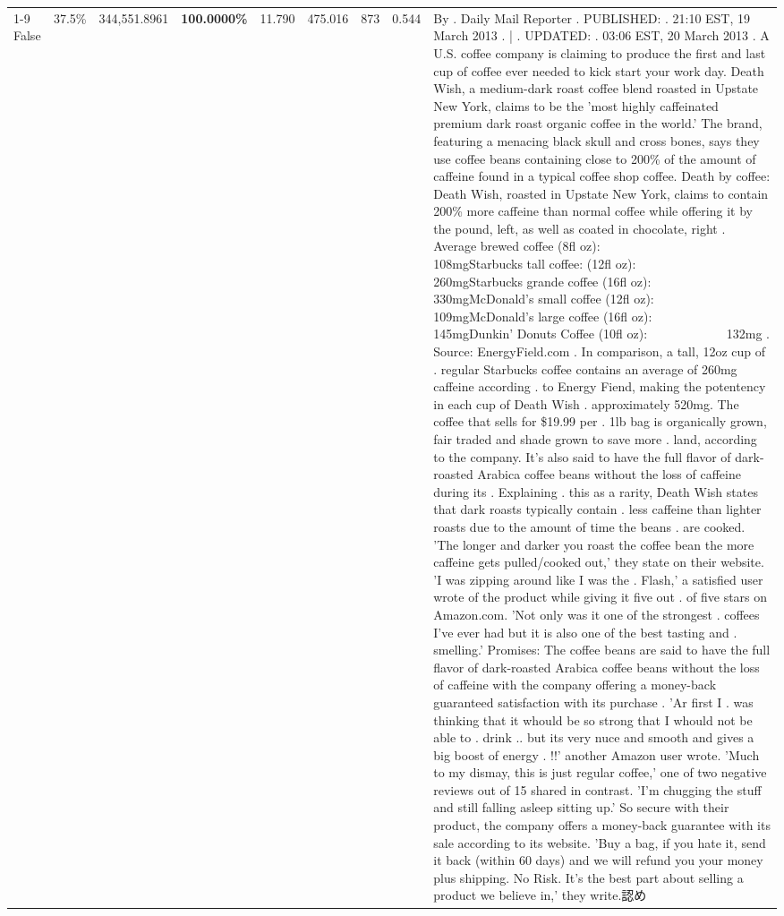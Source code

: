 \begin{table}[H]
{\begin{tabular}{lllrlllll}
\cline{1-9}
False & 37.5\% & 344,551.8961 & \bfseries \color{red} 100.0000\% & 11.790 & 475.016 & 873 & 0.544 & By . Daily Mail Reporter . PUBLISHED: . 21:10 EST, 19 March 2013 . | . UPDATED: . 03:06 EST, 20 March 2013 . A U.S. coffee company is claiming to produce the first and last cup of coffee ever needed to kick start your work day. Death Wish, a medium-dark roast coffee blend roasted in Upstate New York, claims to be the 'most highly caffeinated premium dark roast organic coffee in the world.' The brand, featuring a menacing black skull and cross bones, says they use coffee beans containing close to 200\% of the amount of caffeine found in a typical coffee shop coffee. Death by coffee: Death Wish, roasted in Upstate New York, claims to contain 200\% more caffeine than normal coffee while offering it by the pound, left, as well as coated in chocolate, right . Average brewed coffee (8fl oz):              108mgStarbucks tall coffee: (12fl oz):                260mgStarbucks grande coffee (16fl oz):         330mgMcDonald's small coffee (12fl oz):           109mgMcDonald's large coffee (16fl oz):           145mgDunkin' Donuts Coffee (10fl oz):             132mg . Source: EnergyField.com . In comparison, a tall, 12oz cup of . regular Starbucks coffee contains an average of 260mg caffeine according . to Energy Fiend, making the potentency in each cup of Death Wish . approximately 520mg. The coffee that sells for \$19.99 per . 1lb bag is organically grown, fair traded and shade grown to save more . land, according to the company. It's also said to have the full flavor of dark-roasted Arabica coffee beans without the loss of caffeine during its . Explaining . this as a rarity, Death Wish states that dark roasts typically contain . less caffeine than lighter roasts due to the amount of time the beans . are cooked. 'The longer and darker you roast the coffee bean the more caffeine gets pulled/cooked out,' they state on their website. 'I was zipping around like I was the . Flash,' a satisfied user wrote of the product while giving it five out . of five stars on Amazon.com. 'Not only was it one of the strongest . coffees I've ever had but it is also one of the best tasting and . smelling.’ Promises: The coffee beans are said to have the full flavor of dark-roasted Arabica coffee beans without the loss of caffeine with the company offering a money-back guaranteed satisfaction with its purchase . 'Ar first I . was thinking that it whould be so strong that I whould not be able to . drink .. but its very nuce and smooth and gives a big boost of energy . !!' another Amazon user wrote. 'Much to my dismay, this is just regular coffee,' one of two negative reviews out of 15 shared in contrast. 'I'm chugging the stuff and still falling asleep sitting up.' So secure with their product, the company offers a money-back guarantee with its sale according to its website. 'Buy a bag, if you hate it, send it back (within 60 days) and we will refund you your money plus shipping. No Risk. It’s the best part about selling a product we believe in,' they write.認め \\

\end{tabular}}
\end{table}
